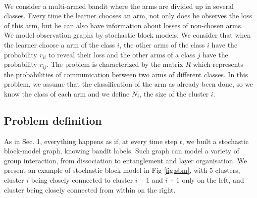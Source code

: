 \documentclass[11pt,a4paper]{article}
\begin{document}
\paragraph{}We consider a multi-armed bandit where the arms are divided up in several classes. Every time the learner chooses an arm, not only does he observes the loss of this arm, but he can also have information about losses of non-chosen arms. We model observation graphs by stochastic block models. We consider that when the learner choose a arm of the class $i$, the other arms of the class $i$ have the probability $r_{ii}$ to reveal their loss and the other arms of a class $j$ have the probability $r_{ij}$. The problem is characterized by the matrix $R$ which represents the probabilities of communication between two arms of different classes. In this problem, we assume that the classification of the arm as already been done, so we know the class of each arm and we define $N_i$, the size of the cluster $i$.

\subsection{Problem definition}

As in Sec. 1, everything happens as if, at every time step $t$, we built a stochastic block-model graph, knowing bandit labels. Such graph can model a variety of group interaction, from dissociation to entanglement and layer organisation. We present an example of stochastic block model in Fig \ref{fig:sbm}, with 5 clusters, cluster $i$ being closely connected to cluster $i-1$ and $i+1$ only on the left, and cluster being closely connected from within on the right.
\end{document}
